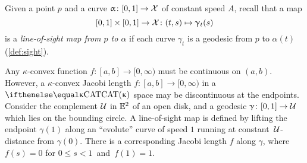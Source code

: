 Given  a point  $p$ and a curve $\alpha\:[0,1]\to \spc{X}$ of constant speed $A$, recall that a map
\[
[0,1]\times[0,1]\to\spc{X}\:(t,s)\mapsto\gamma_t(s)
\] 
is a \emph{line-of-sight map from $p$ to $\alpha$} 
if each curve $\gamma_t$ is a geodesic from $p$ to  $\alpha(t)$ (\ref{def:sight}). 

Any  $\kappa$-convex function $f:[a,b]\to [0,\infty)$ must be continuous on $(a,b)$.
However, a $\kappa$-convex Jacobi length $f:[a,b]\to [0,\infty)$  in a $\CAT\kappa$ space may be discontinuous at the endpoints. 
Consider the complement $\mathcal{U}$  in  $ \mathbb{E}^2$ of an open disk, and  a 
geodesic $\gamma\: [0,1]\to\spc{U}$  which lies on the bounding circle.  
A line-of-sight  map is defined by lifting the endpoint $\gamma(1)$ along an ``evolute''  curve of speed $1$ running at constant \,$\mathcal{U}$-distance from $\gamma(0)$. 
There is a  corresponding Jacobi length $f$ along $\gamma$, where   $f(s)=0$ for $0\le s <1$ \,and\,  $f(1)=1$.






